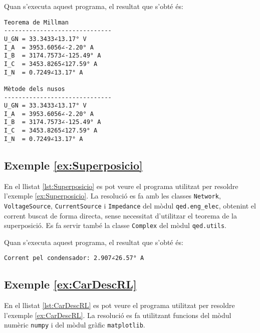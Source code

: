 Quan s'executa aquest programa, el resultat que s'obté és:
\lstset{
	language=,
	numbers=none,
	frame=none
}
\begin{lstlisting}
Teorema de Millman
------------------------------
U_GN = 33.3433∠13.17° V
I_A  = 3953.6056∠-2.20° A
I_B  = 3174.7573∠-125.49° A
I_C  = 3453.8265∠127.59° A
I_N  = 0.7249∠13.17° A

Mètode dels nusos
------------------------------
U_GN = 33.3433∠13.17° V
I_A  = 3953.6056∠-2.20° A
I_B  = 3174.7573∠-125.49° A
I_C  = 3453.8265∠127.59° A
I_N  = 0.7249∠13.17° A
\end{lstlisting} 


\hypertarget{exemple:Superposicio}{\subsection{Exemple \ref*{ex:Superposicio} \Superposicio}}

En el llistat \vref{lst:Superposicio} es pot veure el programa utilitzat per resoldre l'exemple \vref{ex:Superposicio}. La resolució es fa amb les classes \texttt{Network}, \texttt{VoltageSource}, \texttt{CurrentSource} i \texttt{Impedance} del mòdul \texttt{qed.eng\_elec}, obtenint el corrent buscat de forma directa, sense necessitat d'utilitzar el teorema de la superposició. Es fa servir també la classe \texttt{Complex} del mòdul \texttt{qed.utils}.


Quan s'executa aquest programa, el resultat que s'obté és:
\lstset{
	language=,
	numbers=none,
	frame=none
}
\begin{lstlisting}
Corrent pel condensador: 2.907∠26.57° A
\end{lstlisting} 


\hypertarget{exemple:CarDescRL}{\subsection{Exemple \ref*{ex:CarDescRL} \CarDescRL}}

En el llistat \vref{lst:CarDescRL} es pot veure el programa utilitzat per resoldre l'exemple \vref{ex:CarDescRL}. La resolució es fa utilitzant funcions del mòdul numèric \texttt{numpy} i del mòdul gràfic  \texttt{matplotlib}.


